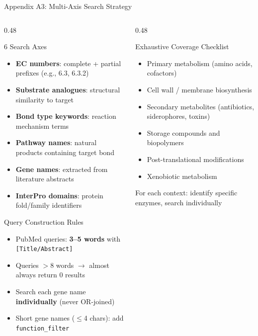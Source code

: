 \documentclass[aspectratio=169, 11pt]{beamer}
\begin{document}
\begin{frame}{Appendix A3: Multi-Axis Search Strategy}
\vspace{-4pt}
\begin{columns}[T]
\begin{column}{0.48\textwidth}
\begin{block}{\small 6 Search Axes}
\vspace{-2pt}
\begin{itemize}\scriptsize
\setlength\itemsep{1pt}
\item \textbf{EC numbers}: complete + partial prefixes (e.g., 6.3, 6.3.2)
\item \textbf{Substrate analogues}: structural similarity to target
\item \textbf{Bond type keywords}: reaction mechanism terms
\item \textbf{Pathway names}: natural products containing target bond
\item \textbf{Gene names}: extracted from literature abstracts
\item \textbf{InterPro domains}: protein fold/family identifiers
\end{itemize}
\end{block}

\begin{alertblock}{\small Query Construction Rules}
\vspace{-2pt}
\begin{itemize}\scriptsize
\setlength\itemsep{0pt}
\item PubMed queries: \textbf{3--5 words} with \texttt{[Title/Abstract]}
\item Queries $>$8 words $\rightarrow$ almost always return 0 results
\item Search each gene name \textbf{individually} (never OR-joined)
\item Short gene names ($\leq$4 chars): add \texttt{function\_filter}
\end{itemize}
\end{alertblock}
\end{column}
\begin{column}{0.48\textwidth}
\begin{exampleblock}{\small Exhaustive Coverage Checklist}
\vspace{-2pt}
\begin{itemize}\scriptsize
\setlength\itemsep{1pt}
\item Primary metabolism (amino acids, cofactors)
\item Cell wall / membrane biosynthesis
\item Secondary metabolites (antibiotics, siderophores, toxins)
\item Storage compounds and biopolymers
\item Post-translational modifications
\item Xenobiotic metabolism
\end{itemize}
\vspace{2pt}
{\tiny\color{accentred} For each context: identify specific enzymes, search individually}
\end{exampleblock}


\end{column}
\end{columns}
\end{frame}
\end{document}
